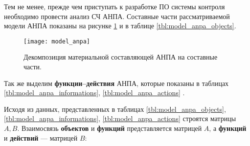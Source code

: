 Тем не менее, прежде чем приступать к разработке ПО системы контроля необходимо провести анализ СЧ АНПА.
Составные части рассматриваемой модели АНПА показаны на рисунке \ref{fig:model_anpa} и в таблице \ref{tbl:model_anpa_objects}.
\begin{center}
    \begin{figure}[hb!]
        \texttt{[image: model\_anpa]}
        \caption{Декомпозиция материальной составляющей АНПА на составные части.}
            \label{fig:model_anpa}
    \end{figure}
\end{center}
%
Так же выделим \textbf{функции--действия} АНПА, которые показаны в таблицах
\ref{tbl:model_anpa_informations}, \ref{tbl:model_anpa_actions} \cite{journal:vestnik_igeu:elizarova}.
%

%
Исходя из данных, представленных в таблицах \ref{tbl:model_anpa_objects}, \ref{tbl:model_anpa_informations}, \ref{tbl:model_anpa_actions}
строятся матрицы $A, B$.
Взаимосвязь \textbf{объектов} и \textbf{функций} представляется матрицей $A$,
а \textbf{функций} и \textbf{действий} --- матрицей $B$:
%
